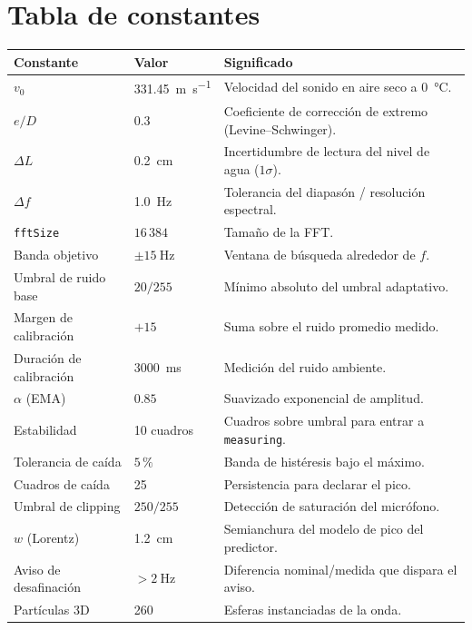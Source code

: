 \documentclass[11pt,a4paper]{article}
\begin{document}
\section{Tabla de constantes}

\begin{center}
\begin{tabular}{@{}llp{6.6cm}@{}}
\toprule
Constante & Valor & Significado \\
\midrule
$v_0$ & \SI{331.45}{\metre\per\second} & Velocidad del sonido en aire seco a \SI{0}{\celsius}. \\
$e/D$ & $0.3$ & Coeficiente de corrección de extremo (Levine--Schwinger). \\
$\Delta L$ & \SI{0.2}{\centi\metre} & Incertidumbre de lectura del nivel de agua ($1\sigma$). \\
$\Delta f$ & \SI{1.0}{\hertz} & Tolerancia del diapasón / resolución espectral. \\
\texttt{fftSize} & $16\,384$ & Tamaño de la FFT. \\
Banda objetivo & $\pm\SI{15}{\hertz}$ & Ventana de búsqueda alrededor de $f$. \\
Umbral de ruido base & $20/255$ & Mínimo absoluto del umbral adaptativo. \\
Margen de calibración & $+15$ & Suma sobre el ruido promedio medido. \\
Duración de calibración & \SI{3000}{\milli\second} & Medición del ruido ambiente. \\
$\alpha$ (EMA) & $0.85$ & Suavizado exponencial de amplitud. \\
Estabilidad & 10 cuadros & Cuadros sobre umbral para entrar a \texttt{measuring}. \\
Tolerancia de caída & $5\,\%$ & Banda de histéresis bajo el máximo. \\
Cuadros de caída & 25 & Persistencia para declarar el pico. \\
Umbral de clipping & $250/255$ & Detección de saturación del micrófono. \\
$w$ (Lorentz) & \SI{1.2}{\centi\metre} & Semianchura del modelo de pico del predictor. \\
Aviso de desafinación & $>\SI{2}{\hertz}$ & Diferencia nominal/medida que dispara el aviso. \\
Partículas 3D & 260 & Esferas instanciadas de la onda. \\
\bottomrule
\end{tabular}
\end{center}
\end{document}
